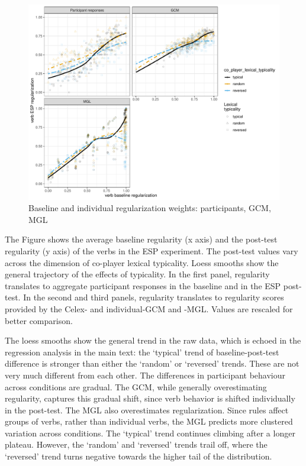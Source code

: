 \documentclass[12pt]{article}
\begin{document}
\begin{figure}
\centering
\includegraphics[width = \textwidth]{si_figure.pdf}
\caption{Baseline and individual regularization weights: participants, GCM, MGL}
\label{bigfigure}
\end{figure}

The Figure shows the average baseline regularity (x axis) and the post-test regularity (y axis) of the verbs in the ESP experiment. The post-test values vary across the dimension of co-player lexical typicality. Loess smooths show the general trajectory of the effects of typicality. In the first panel, regularity translates to aggregate participant responses in the baseline and in the ESP post-test. In the second and third panels, regularity translates to regularity scores provided by the {\sc Celex}- and individual-GCM and -MGL. Values are rescaled for better comparison.

The loess smooths show the general trend in the raw data, which is echoed in the regression analysis in the main text: the `typical' trend of baseline-post-test difference is stronger than either the `random' or `reversed' trends. These are not very much different from each other. The differences in participant behaviour across conditions are gradual. The GCM, while generally overestimating regularity, captures this gradual shift, since verb behavior is shifted individually in the post-test. The MGL also overestimates regularization. Since rules affect groups of verbs, rather than individual verbs, the MGL predicts more clustered variation across conditions. The `typical' trend continues climbing after a longer plateau. However, the `random' and `reversed' trends trail off, where the `reversed' trend turns negative towards the higher tail of the distribution.


\newpage



\end{document}
